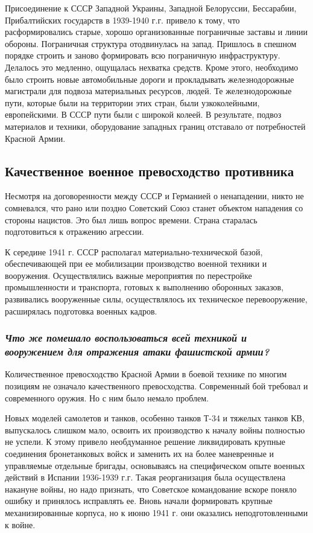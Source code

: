 \documentclass[12pt]{article}
\begin{document}
  Присоединение к СССР Западной Украины, Западной Белоруссии, Бессарабии, Прибалтийских государств в 1939-1940 г.г. привело к тому,
  что расформировались старые, хорошо организованные пограничные заставы и линии обороны.
  Пограничная структура отодвинулась на запад.
  Пришлось в спешном порядке строить и заново формировать всю пограничную инфраструктуру.
  Делалось это медленно, ощущалась нехватка средств.
  Кроме этого, необходимо было строить новые автомобильные дороги и прокладывать железнодорожные магистрали для подвоза материальных ресурсов, людей.
  Те железнодорожные пути, которые были на территории этих стран, были узкоколейными, европейскими.
  В СССР пути были с широкой колеей.
  В результате, подвоз материалов и техники, оборудование западных границ отставало от потребностей Красной Армии.

  \subsection{Качественное военное превосходство противника}
  Несмотря на договоренности между СССР и Германией о ненападении, никто не сомневался,
  что рано или поздно Советский Союз станет объектом нападения со стороны нацистов.
  Это был лишь вопрос времени.
  Страна старалась подготовиться к отражению агрессии.

  К середине 1941 г. СССР располагал материально-технической базой, обеспечивающей при ее мобилизации
  производство военной техники и вооружения.
  Осуществлялись важные мероприятия по перестройке промышленности и транспорта, готовых к выполнению оборонных заказов,
  развивались вооруженные силы, осуществлялось их техническое перевооружение, расширялась подготовка военных кадров.

  \subsubsection*{\textit{Что же помешало воспользоваться всей техникой и вооружением для отражения атаки фашистской армии?}}
  Количественное превосходство Красной Армии в боевой технике по многим позициям не означало качественного превосходства.
  Современный бой требовал и современного оружия.
  Но с ним было немало проблем.

  Новых моделей самолетов и танков, особенно танков Т-34 и тяжелых танков КВ, выпускалось слишком мало,
  освоить их производство к началу войны полностью не успели.
  К этому привело необдуманное решение ликвидировать крупные соединения бронетанковых войск и заменить их
  на более маневренные и управляемые отдельные бригады, основываясь на специфическом опыте военных действий в Испании 1936-1939 г.г.
  Такая реорганизация была осуществлена накануне войны, но надо признать,
  что Советское командование вскоре поняло ошибку и принялось исправлять ее.
  Вновь начали формировать крупные механизированные корпуса, но к июню 1941 г. они оказались неподготовленными к войне.
\end{document}
